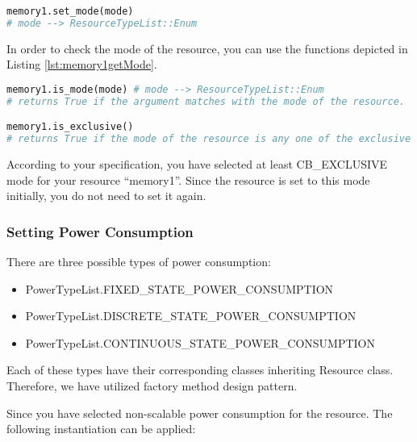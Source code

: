 \documentclass[]{scrartcl}
\begin{document}
\begin{lstlisting}[language=Python, frame=single, label={lst:memory1setMode}, caption={Setting the mode of a resource after creating a resource.}]
memory1.set_mode(mode)
# mode --> ResourceTypeList::Enum
\end{lstlisting}
        

In order to check the mode of the resource, you can use the functions depicted in Listing \ref{lst:memory1getMode}.

\begin{lstlisting}[language=Python, frame=single, label={lst:memory1getMode}, caption={The functions for resource mode check.}]
memory1.is_mode(mode) # mode --> ResourceTypeList::Enum
# returns True if the argument matches with the mode of the resource.

memory1.is_exclusive()
# returns True if the mode of the resource is any one of the exclusive mode.
\end{lstlisting}
        
        
According to your specification, you have selected at least \textsf{CB\_EXCLUSIVE} mode for your resource ``memory1''. Since the resource is set to this mode initially, you do not need to set it again.
        
\subsubsection{Setting Power Consumption}
There are three possible types of power consumption:
\begin{itemize}
    \item \textsf{PowerTypeList.FIXED\_STATE\_POWER\_CONSUMPTION}
    \item \textsf{PowerTypeList.DISCRETE\_STATE\_POWER\_CONSUMPTION}
    \item \textsf{PowerTypeList.CONTINUOUS\_STATE\_POWER\_CONSUMPTION}
\end{itemize}
Each of these types have their corresponding classes inheriting \textsf{Resource} class. Therefore, we have utilized factory method design pattern.
        
Since you have selected non-scalable power consumption for the resource. The following instantiation can be applied:
\end{document}
